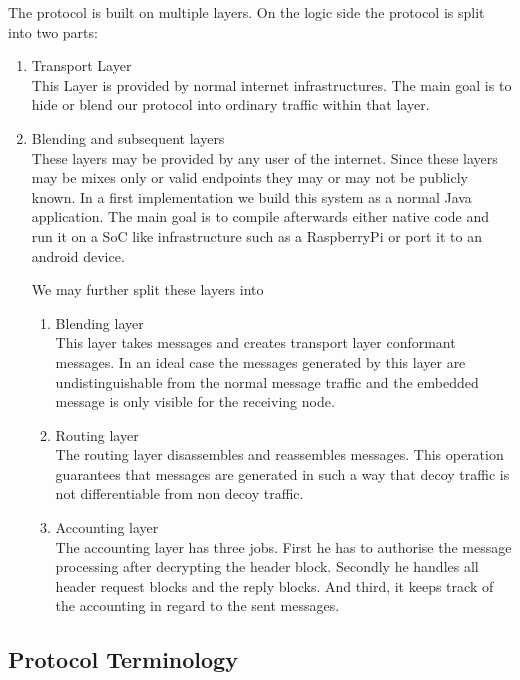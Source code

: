 The protocol is built on multiple layers. On the logic side the protocol is split into two parts:
\begin{enumerate}
	\item Transport Layer\\
	      This Layer is provided by normal internet infrastructures. The main goal is to hide or blend our protocol into ordinary traffic within that layer.
	\item Blending and subsequent layers\\
	      These layers may be provided by any user of the internet. Since these layers may be mixes only or valid endpoints they may or may not be publicly known. In a first implementation we build this system as a normal Java application. The main goal is to compile afterwards either native code and run it on a SoC like infrastructure such as a RaspberryPi or port it to an android device.
	      
	      We may further split these layers into
	      \begin{enumerate}
	      	\item Blending layer\\
	      	      This layer takes messages and creates transport layer conformant messages. In an ideal case the messages generated by this layer are undistinguishable from the normal message traffic and the embedded message is only visible for the receiving node.
	      	\item Routing layer\\
	      	      The routing layer disassembles and reassembles messages. This operation guarantees that messages are generated in such a way that decoy traffic is not differentiable from non decoy traffic.
	      	\item Accounting layer\\
	      	      The accounting layer has three jobs. First he has to authorise the message processing after decrypting the header block. Secondly he handles all header request blocks and the reply blocks. And third, it keeps track of the accounting in regard to the sent messages.    
	      \end{enumerate}
\end{enumerate}

\subsection{Protocol Terminology}

